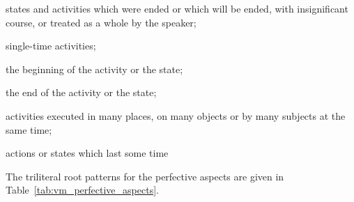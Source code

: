 \documentclass[grammar]{subfiles}
\begin{document}
  \begin{itemize*}
    \item states and activities which were ended or which will be ended, with insignificant course, or treated as a whole by the speaker;
    \item single-time activities;
    \item the beginning of the activity or the state;
    \item the end of the activity or the state;
    \item activities executed in many places, on many objects or by many subjects at the same time;
    \item actions or states which last some time
  \end{itemize*}

  The triliteral root patterns for the perfective aspects are given in Table~\ref{tab:vm_perfective_aspects}.
\end{document}
